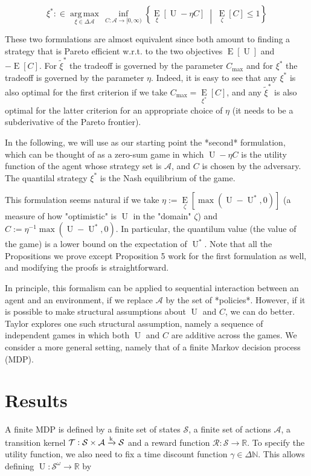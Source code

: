 \documentclass[a4paper]{article}
\newcommand{\AP}[1]{\left(#1\right)}
\newcommand{\AB}[1]{\left[#1\right]}
\newcommand{\ACM}[2]{\left\{#1\;\middle\vert\;#2\right\}}
\newcommand{\Ea}[2]{\underset{#1}{\operatorname{E}}\AB{#2}}
\newcommand{\Argmax}[1]{\underset{#1}{\operatorname{arg\,max}}\,}
\newcommand{\Nats}{\mathbb{N}}
\newcommand{\Reals}{\mathbb{R}}
\newcommand{\K}{\xrightarrow{\textnormal{k}}}
\newcommand{\A}{\mathcal{A}}
\newcommand{\St}{\mathcal{S}}
\newcommand{\T}{\mathcal{T}}
\newcommand{\R}{\mathcal{R}}
\newcommand{\Ut}{\operatorname{U}}
\newcommand{\Co}{C}
\begin{document}
$$\xi^* :\in \Argmax{\xi \in \Delta\A}\inf_{\Co:\A\rightarrow[0,\infty)}\ACM{\Ea{\xi}{\Ut-\eta \Co}}{\Ea{\zeta}{\Co} \leq 1}$$

These two formulations are almost equivalent since both amount to finding a strategy that is Pareto efficient w.r.t. to the two objectives $\Ea{}{\Ut}$ and $-\Ea{}{\Co}$. For $\tilde{\xi}^*$ the tradeoff is governed by the parameter $C_{\max}$ and for $\xi^*$ the tradeoff is governed by the parameter $\eta$. Indeed, it is easy to see that any $\xi^*$ is also optimal for the first criterion if we take $C_{\max}=\Ea{\xi^*}{\Co}$, and any $\tilde{\xi}^*$ is also optimal for the latter criterion for an appropriate choice of $\eta$ (it needs to be a subderivative of the Pareto frontier).

In the following, we will use as our starting point the *second* formulation, which can be thought of as a zero-sum game in which $\Ut-\eta \Co$ is the utility function of the agent whose strategy set is $\A$, and $\Co$ is chosen by the adversary. The quantilal strategy $\xi^*$ is the Nash equilibrium of the game.

This formulation seems natural if we take $\eta:=\Ea{\zeta}{\max\AP{\Ut-\Ut^*,0}}$ (a measure of how "optimistic" is $\Ut$ in the "domain" $\zeta$) and $\Co:=\eta^{-1}\max\AP{\Ut-\Ut^*,0}$. In particular, the quantilum value (the value of the game) is a lower bound on the expectation of $\Ut^*$. Note that all the Propositions we prove except Proposition 5 work for the first formulation as well, and modifying the proofs is straightforward.

In principle, this formalism can be applied to sequential interaction between an agent and an environment, if we replace $\A$ by the set of *policies*. However, if it is possible to make structural assumptions about $\Ut$ and $C$, we can do better. Taylor explores one such structural assumption, namely a sequence of independent games in which both $\Ut$ and $\Co$ are additive across the games. We consider a more general setting, namely that of a finite Markov decision process (MDP).

\section{Results}

A finite MDP is defined by a finite set of states $\St$, a finite set of actions $\A$, a transition kernel $\T: \St \times \A \K \St$ and a reward function $\R: \St \rightarrow \Reals$. To specify the utility function, we also need to fix a time discount function $\gamma \in \Delta\Nats$. This allows defining $\Ut: \St^\omega \rightarrow \Reals$ by
\end{document}
